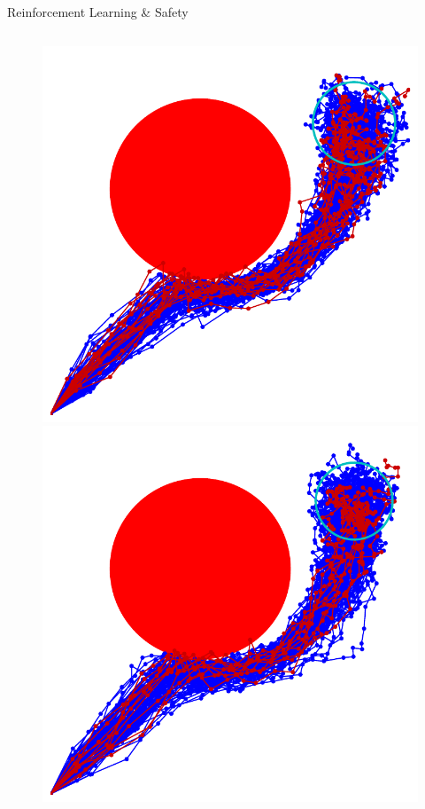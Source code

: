 \documentclass[lecture]{beamer}
\begin{document}
\begin{frame}{\normalsize Reinforcement Learning \& Safety}
\begin{columns}
\begin{overlayarea}{\textwidth}{.55\textheight}
\begin{figure}
{	}
	      \only<9>
        {
        \center
	\includegraphics[width=1\textwidth,clip]{Codes/RL/RLSafety6.pdf}
	}
	      \only<10>
        {
        \center
	\includegraphics[width=1\textwidth,clip]{Codes/RL/RLSafety7.pdf}
}
\end{figure}
\end{overlayarea}
\end{columns}
\end{frame}
\end{document}
